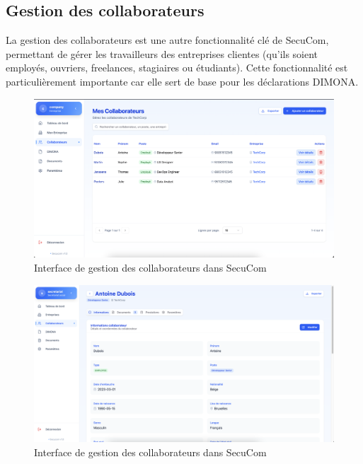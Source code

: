\subsection{Gestion des collaborateurs}

La gestion des collaborateurs est une autre fonctionnalité clé de SecuCom, permettant de gérer les travailleurs des entreprises clientes (qu'ils soient employés, ouvriers, freelances, stagiaires ou étudiants). Cette fonctionnalité est particulièrement importante car elle sert de base pour les déclarations DIMONA.

\vspace{0.5cm}

\begin{figure}[H]
  \centering
  \includegraphics[width=1\textwidth]{SecuComPreviewCompanySpace.png}
  \caption{Interface de gestion des collaborateurs dans SecuCom}
  \label{fig:companyManagementInterface}
\end{figure}
\vspace{0.5cm}
\begin{figure}[H]
  \centering
  \includegraphics[width=1\textwidth]{SecuComPreviewCollaboratorInfos.png}
  \caption{Interface de gestion des collaborateurs dans SecuCom}
  \label{fig:companyManagementInterface}
\end{figure}

